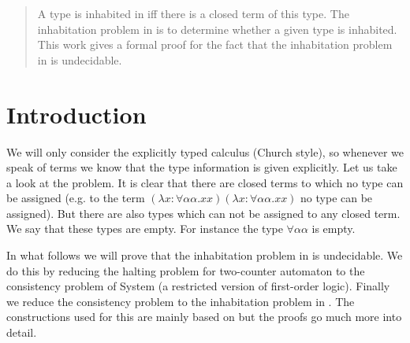 \begin{abstract}
A \lambdaTwo{} type is inhabited in \lambdaTwo{} iff there is a closed \lambdaTwo{} term of this type. The inhabitation problem in \lambdaTwo{} is to determine whether a given \lambdaTwo{} type is inhabited. This work gives a formal proof for the fact that the inhabitation problem in \lambdaTwo{} is undecidable.
\end{abstract}

\section{Introduction}\label{sec.1}
We will only consider the explicitly typed \lambdaTwo{} calculus (Church style), so whenever we speak of \lambdaTwo{} terms we know that the type information is given explicitly. 
Let us take a look at the problem. It is clear that there are closed \lambdaTwo{} terms to which no \lambdaTwo{} type can be assigned (e.g. to the \lambdaTwo{} term $(\lambda x:\forall\alpha\alpha.xx)(\lambda x:\forall\alpha\alpha.xx)$ no type can be assigned). But there are also \lambdaTwo{} types which can not be assigned to any closed \lambdaTwo{} term. We say that these types are empty. For instance the \lambdaTwo{} type $\forall\alpha\alpha$ is empty.

In what follows we will prove that the inhabitation problem in \lambdaTwo{} is undecidable. We do this by reducing the halting problem for two-counter automaton to the consistency problem of System \SysP{} (a restricted version of first-order logic). Finally we reduce the consistency problem to the inhabitation problem in \lambdaTwo{}.
The constructions used for this are mainly based on \cite{2} but the proofs go much more into detail.

